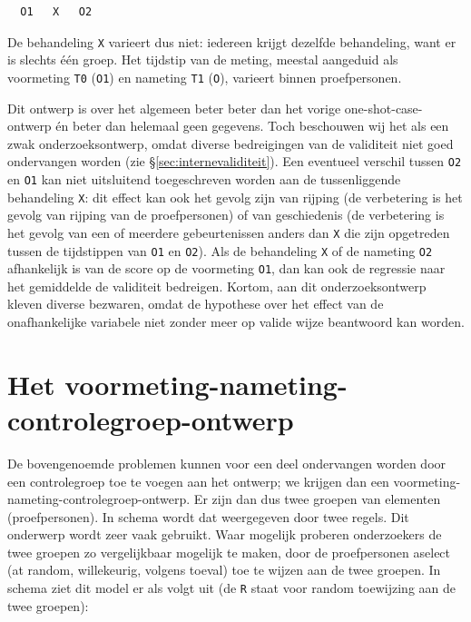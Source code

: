 \documentclass[
]{book}
\begin{document}
\begin{verbatim}
  O1   X   O2
\end{verbatim}

De behandeling \texttt{X} varieert dus niet: iedereen krijgt dezelfde
behandeling, want er is slechts één groep. Het tijdstip van de meting,
meestal aangeduid als voormeting \texttt{T0} (\texttt{O1}) en nameting \texttt{T1} (\texttt{O}),
varieert binnen proefpersonen.

Dit ontwerp is over het algemeen beter beter dan het vorige
one-shot-case-ontwerp én beter dan helemaal geen gegevens. Toch
beschouwen wij het als een zwak onderzoeksontwerp, omdat diverse
bedreigingen van de validiteit niet goed ondervangen worden (zie
§\ref{sec:internevaliditeit}). Een eventueel verschil tussen \texttt{O2}
en \texttt{O1} kan niet uitsluitend toegeschreven worden aan de tussenliggende
behandeling \texttt{X}: dit effect kan ook het gevolg zijn van rijping (de
verbetering is het gevolg van rijping van de proefpersonen) of van
geschiedenis (de verbetering is het gevolg van een of meerdere
gebeurtenissen anders dan \texttt{X} die zijn opgetreden tussen de tijdstippen
van \texttt{O1} en \texttt{O2}). Als de behandeling \texttt{X} of de nameting \texttt{O2}
afhankelijk is van de score op de voormeting \texttt{O1}, dan kan ook de
regressie naar het gemiddelde de validiteit bedreigen. Kortom, aan dit
onderzoeksontwerp kleven diverse bezwaren, omdat de hypothese over het
effect van de onafhankelijke variabele niet zonder meer op valide wijze
beantwoord kan worden.

\hypertarget{sec:voormeting-nameting-controlegroep-ontwerp}{%
\section{Het voormeting-nameting-controlegroep-ontwerp}\label{sec:voormeting-nameting-controlegroep-ontwerp}}

De bovengenoemde problemen kunnen voor een deel ondervangen worden door
een controlegroep toe te voegen aan het ontwerp; we krijgen dan een
voormeting-nameting-controlegroep-ontwerp. Er zijn dan dus twee groepen
van elementen (proefpersonen). In schema wordt dat weergegeven door twee
regels. Dit onderwerp wordt zeer vaak gebruikt. Waar mogelijk proberen
onderzoekers de twee groepen zo vergelijkbaar mogelijk te maken, door de
proefpersonen aselect (at random, willekeurig, volgens toeval) toe te
wijzen aan de twee groepen. In schema ziet dit model er als volgt uit
(de \texttt{R} staat voor random toewijzing aan de twee groepen):
\end{document}

